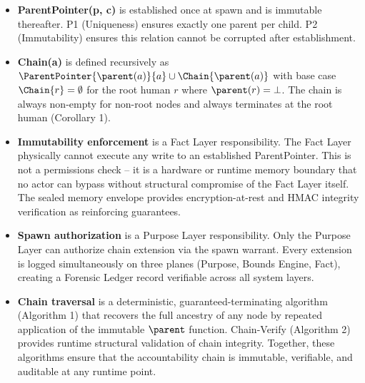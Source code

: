 \begin{itemize}[noitemsep]
    \item \textbf{ParentPointer(p, c)} is established once at spawn and is immutable thereafter. P1 (Uniqueness) ensures exactly one parent per child. P2 (Immutability) ensures this relation cannot be corrupted after establishment.

    \item \textbf{Chain(a)} is defined recursively as $\ParentPointer{\parent(a)}{a} \cup \Chain{\parent(a)}$ with base case $\Chain{r} = \emptyset$ for the root human $r$ where $\parent(r) = \bot$. The chain is always non-empty for non-root nodes and always terminates at the root human (Corollary 1).

    \item \textbf{Immutability enforcement} is a Fact Layer responsibility. The Fact Layer physically cannot execute any write to an established ParentPointer. This is not a permissions check -- it is a hardware or runtime memory boundary that no actor can bypass without structural compromise of the Fact Layer itself. The sealed memory envelope provides encryption-at-rest and HMAC integrity verification as reinforcing guarantees.

    \item \textbf{Spawn authorization} is a Purpose Layer responsibility. Only the Purpose Layer can authorize chain extension via the spawn warrant. Every extension is logged simultaneously on three planes (Purpose, Bounds Engine, Fact), creating a Forensic Ledger record verifiable across all system layers.

    \item \textbf{Chain traversal} is a deterministic, guaranteed-terminating algorithm (Algorithm 1) that recovers the full ancestry of any node by repeated application of the immutable $\parent$ function. Chain-Verify (Algorithm 2) provides runtime structural validation of chain integrity. Together, these algorithms ensure that the accountability chain is immutable, verifiable, and auditable at any runtime point.
\end{itemize}
